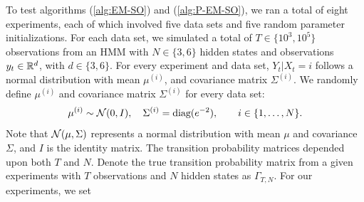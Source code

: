 
To test algorithms (\ref{alg:EM-SO}) and (\ref{alg:P-EM-SO}), we ran a total of eight experiments, each of which involved five data sets and five random parameter initializations. For each data set, we simulated a total of $T \in \{10^3,10^5\}$ observations from an HMM with $N \in \{3,6\}$ hidden states and observations $y_t \in \mathbb{R}^d$, with $d \in \{3,6\}$. For every experiment and data set, $Y_t | X_t = i$ follows a normal distribution with mean $\mu^{(i)}$, and covariance matrix $\Sigma^{(i)}$. We randomly define $\mu^{(i)}$ and covariance matrix $\Sigma^{(i)}$ for every data set:
%
\begin{equation*}
    \mu^{(i)} \sim \mathcal{N}(0,I), \quad \Sigma^{(i)} = \text{diag}(e^{-2}), \qquad i \in \{1,\ldots,N\}.
\end{equation*}
%
Note that $\mathcal{N}(\mu,\Sigma)$ represents a normal distribution with mean $\mu$ and covariance $\Sigma$, and $I$ is the identity matrix.
%
The transition probability matrices depended upon both $T$ and $N$. Denote the true transition probability matrix from a given experiments with $T$ observations and $N$ hidden states as $\Gamma_{T,N}$. For our experiments, we set
%
